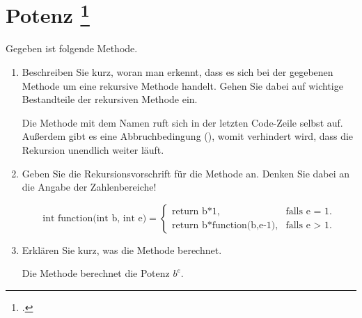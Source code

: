 \documentclass{lehramt-informatik-aufgabe}
\begin{document}

\section{Potenz
\footcite[Aufgabe 2: Rekursion, Seite 2]{aud:ab:1}}

Gegeben ist folgende Methode.

\begin{enumerate}


\item Beschreiben Sie kurz, woran man erkennt, dass es sich bei der
gegebenen Methode um eine rekursive Methode handelt. Gehen Sie dabei auf
wichtige Bestandteile der rekursiven Methode ein.

\begin{antwort}
Die Methode mit dem Namen  ruft sich in der letzten
Code-Zeile selbst auf. Außerdem gibt es eine Abbruchbedingung
(), womit verhindert wird, dass die
Rekursion unendlich weiter läuft.
\end{antwort}


\item Geben Sie die Rekursionsvorschrift für die Methode 
an. Denken Sie dabei an die Angabe der Zahlenbereiche!

\begin{antwort}
\begin{equation*}
\text{int function(int b, int e)} =
\begin{cases}
\text{return b*1}, & \text{falls e = 1}.\\
\text{return b*function(b,e-1)}, & \text{falls e > 1}.
\end{cases}
\end{equation*}
\end{antwort}


\item Erklären Sie kurz, was die Methode  berechnet.

\begin{antwort}
Die Methode  berechnet die Potenz $b^e$.
\end{antwort}
\end{enumerate}
\end{document}
